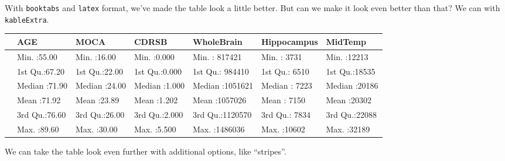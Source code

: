\documentclass[]{article}
\newenvironment{Shaded}{\begin{snugshade}}{\end{snugshade}}
\newcommand{\DataTypeTok}[1]{\textcolor[rgb]{0.13,0.29,0.53}{#1}}
\newcommand{\DecValTok}[1]{\textcolor[rgb]{0.00,0.00,0.81}{#1}}
\newcommand{\KeywordTok}[1]{\textcolor[rgb]{0.13,0.29,0.53}{\textbf{#1}}}
\newcommand{\NormalTok}[1]{#1}
\newcommand{\OperatorTok}[1]{\textcolor[rgb]{0.81,0.36,0.00}{\textbf{#1}}}
\newcommand{\StringTok}[1]{\textcolor[rgb]{0.31,0.60,0.02}{#1}}
\begin{document}
With \texttt{booktabs} and \texttt{latex} format, we've made the table
look a little better. But can we make it look even better than that? We
can with \texttt{kableExtra}.

\begin{Shaded}
\end{Shaded}

\begin{table}[H]
\centering\begingroup\fontsize{10}{12}\selectfont

\begin{tabular}{lllllll}
\toprule
  &      AGE &      MOCA &     CDRSB &   WholeBrain &  Hippocampus &    MidTemp\\
\midrule
 & Min.   :55.00 & Min.   :16.00 & Min.   :0.000 & Min.   : 817421 & Min.   : 3731 & Min.   :12213\\
 & 1st Qu.:67.20 & 1st Qu.:22.00 & 1st Qu.:0.000 & 1st Qu.: 984410 & 1st Qu.: 6510 & 1st Qu.:18535\\
 & Median :71.90 & Median :24.00 & Median :1.000 & Median :1051621 & Median : 7223 & Median :20186\\
 & Mean   :71.92 & Mean   :23.89 & Mean   :1.202 & Mean   :1057026 & Mean   : 7150 & Mean   :20302\\
 & 3rd Qu.:76.60 & 3rd Qu.:26.00 & 3rd Qu.:2.000 & 3rd Qu.:1120570 & 3rd Qu.: 7834 & 3rd Qu.:22088\\
 & Max.   :89.60 & Max.   :30.00 & Max.   :5.500 & Max.   :1486036 & Max.   :10602 & Max.   :32189\\
\bottomrule
\end{tabular}\endgroup{}
\end{table}

We can take the table look even further with additional options, like
``stripes''.

\begin{Shaded}
\end{Shaded}
\end{document}
